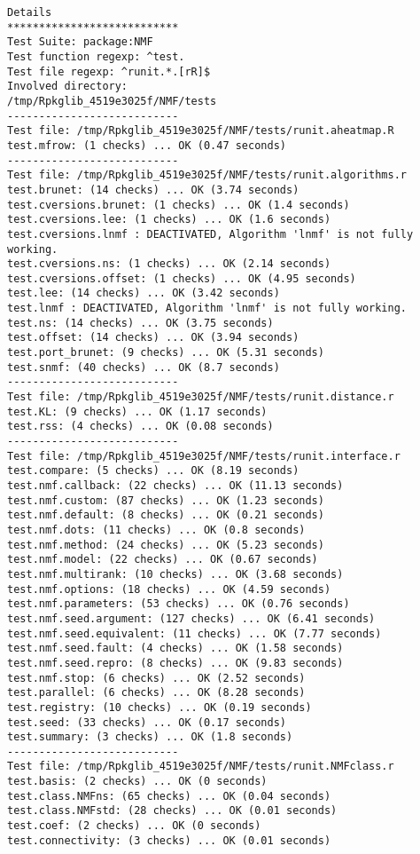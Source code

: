 \documentclass[10pt]{article}
\begin{document}
\begin{verbatim}
Details 
*************************** 
Test Suite: package:NMF 
Test function regexp: ^test. 
Test file regexp: ^runit.*.[rR]$ 
Involved directory: 
/tmp/Rpkglib_4519e3025f/NMF/tests 
--------------------------- 
Test file: /tmp/Rpkglib_4519e3025f/NMF/tests/runit.aheatmap.R 
test.mfrow: (1 checks) ... OK (0.47 seconds)
--------------------------- 
Test file: /tmp/Rpkglib_4519e3025f/NMF/tests/runit.algorithms.r 
test.brunet: (14 checks) ... OK (3.74 seconds)
test.cversions.brunet: (1 checks) ... OK (1.4 seconds)
test.cversions.lee: (1 checks) ... OK (1.6 seconds)
test.cversions.lnmf : DEACTIVATED, Algorithm 'lnmf' is not fully working.
test.cversions.ns: (1 checks) ... OK (2.14 seconds)
test.cversions.offset: (1 checks) ... OK (4.95 seconds)
test.lee: (14 checks) ... OK (3.42 seconds)
test.lnmf : DEACTIVATED, Algorithm 'lnmf' is not fully working.
test.ns: (14 checks) ... OK (3.75 seconds)
test.offset: (14 checks) ... OK (3.94 seconds)
test.port_brunet: (9 checks) ... OK (5.31 seconds)
test.snmf: (40 checks) ... OK (8.7 seconds)
--------------------------- 
Test file: /tmp/Rpkglib_4519e3025f/NMF/tests/runit.distance.r 
test.KL: (9 checks) ... OK (1.17 seconds)
test.rss: (4 checks) ... OK (0.08 seconds)
--------------------------- 
Test file: /tmp/Rpkglib_4519e3025f/NMF/tests/runit.interface.r 
test.compare: (5 checks) ... OK (8.19 seconds)
test.nmf.callback: (22 checks) ... OK (11.13 seconds)
test.nmf.custom: (87 checks) ... OK (1.23 seconds)
test.nmf.default: (8 checks) ... OK (0.21 seconds)
test.nmf.dots: (11 checks) ... OK (0.8 seconds)
test.nmf.method: (24 checks) ... OK (5.23 seconds)
test.nmf.model: (22 checks) ... OK (0.67 seconds)
test.nmf.multirank: (10 checks) ... OK (3.68 seconds)
test.nmf.options: (18 checks) ... OK (4.59 seconds)
test.nmf.parameters: (53 checks) ... OK (0.76 seconds)
test.nmf.seed.argument: (127 checks) ... OK (6.41 seconds)
test.nmf.seed.equivalent: (11 checks) ... OK (7.77 seconds)
test.nmf.seed.fault: (4 checks) ... OK (1.58 seconds)
test.nmf.seed.repro: (8 checks) ... OK (9.83 seconds)
test.nmf.stop: (6 checks) ... OK (2.52 seconds)
test.parallel: (6 checks) ... OK (8.28 seconds)
test.registry: (10 checks) ... OK (0.19 seconds)
test.seed: (33 checks) ... OK (0.17 seconds)
test.summary: (3 checks) ... OK (1.8 seconds)
--------------------------- 
Test file: /tmp/Rpkglib_4519e3025f/NMF/tests/runit.NMFclass.r 
test.basis: (2 checks) ... OK (0 seconds)
test.class.NMFns: (65 checks) ... OK (0.04 seconds)
test.class.NMFstd: (28 checks) ... OK (0.01 seconds)
test.coef: (2 checks) ... OK (0 seconds)
test.connectivity: (3 checks) ... OK (0.01 seconds)

\end{verbatim}
\end{document}
